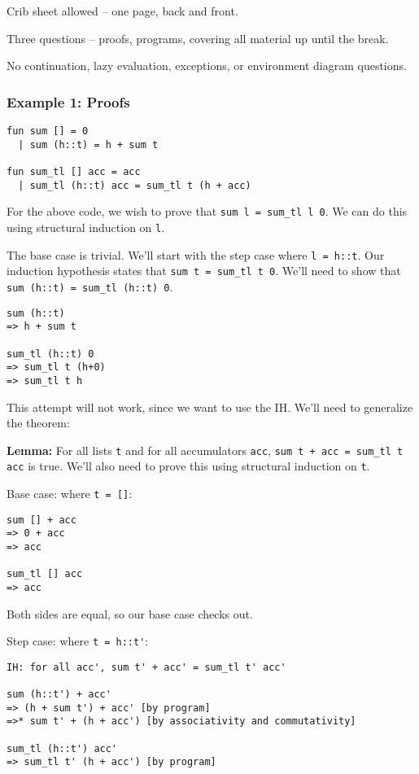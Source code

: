 \documentclass[11pt]{article}
\begin{document}
Crib sheet allowed -- one page, back and front.

Three questions -- proofs, programs, covering all material up until the break.

No continuation, lazy evaluation, exceptions, or environment diagram questions.

\subsubsection{Example 1: Proofs}
\begin{verbatim}
fun sum [] = 0
  | sum (h::t) = h + sum t

fun sum_tl [] acc = acc
  | sum_tl (h::t) acc = sum_tl t (h + acc)
\end{verbatim}

For the above code, we wish to prove that \verb~sum l = sum_tl l 0~. We can do this using structural induction on \verb~l~. 

The base case is trivial. We'll start with the step case where \verb~l = h::t~. Our induction hypothesis states that \verb~sum t = sum_tl t 0~. We'll need to show that \verb~sum (h::t) = sum_tl (h::t) 0~.

\begin{verbatim}
sum (h::t)
=> h + sum t

sum_tl (h::t) 0
=> sum_tl t (h+0)
=> sum_tl t h
\end{verbatim}

This attempt will not work, since we want to use the IH. We'll need to generalize the theorem:

\textbf{Lemma:} For all lists \verb~t~ and for all accumulators \verb~acc~, \verb~sum t + acc = sum_tl t acc~ is true. We'll also need to prove this using structural induction on \verb~t~.

Base case: where \verb~t = []~:
\begin{verbatim}
sum [] + acc
=> 0 + acc
=> acc

sum_tl [] acc
=> acc
\end{verbatim}

Both sides are equal, so our base case checks out.

Step case: where \verb~t = h::t'~:

\begin{verbatim}
IH: for all acc', sum t' + acc' = sum_tl t' acc'

sum (h::t') + acc'
=> (h + sum t') + acc' [by program]
=>* sum t' + (h + acc') [by associativity and commutativity]

sum_tl (h::t') acc'
=> sum_tl t' (h + acc') [by program]
\end{verbatim}
\end{document}
